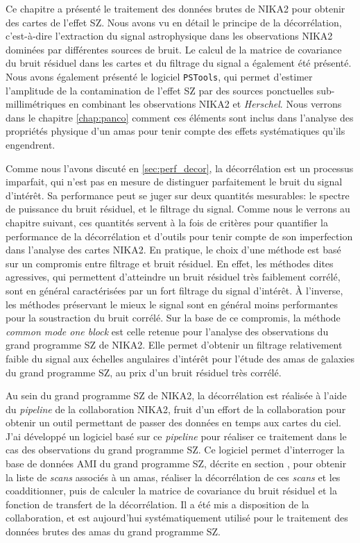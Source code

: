 Ce chapitre a présenté le traitement des données brutes de NIKA2 pour obtenir des cartes de l'effet SZ.
Nous avons vu en détail le principe de la décorrélation, c'est-à-dire l'extraction du signal astrophysique dans les observations NIKA2 dominées par différentes sources de bruit.
Le calcul de la matrice de covariance du bruit résiduel dans les cartes et du filtrage du signal a également été présenté.
Nous avons également présenté le logiciel \texttt{PSTools}, qui permet d'estimer l'amplitude de la contamination de l'effet SZ par des sources ponctuelles sub-millimétriques en combinant les observations NIKA2 et \textit{Herschel}.
Nous verrons dans le chapitre \ref{chap:panco} comment ces éléments sont inclus dans l'analyse des propriétés physique d'un amas pour tenir compte des effets systématiques qu'ils engendrent.

Comme nous l'avons discuté en \ref{sec:perf_decor}, la décorrélation est un processus imparfait, qui n'est pas en mesure de distinguer parfaitement le bruit du signal d'intérêt.
Sa performance peut se juger sur deux quantités mesurables: le spectre de puissance du bruit résiduel, et le filtrage du signal.
Comme nous le verrons au chapitre suivant, ces quantités servent à la fois de critères pour quantifier la performance de la décorrélation et d'outils pour tenir compte de son imperfection dans l'analyse des cartes NIKA2.
En pratique, le choix d'une méthode est basé sur un compromis entre filtrage et bruit résiduel.
En effet, les méthodes dites agressives, qui permettent d'atteindre un bruit résiduel très faiblement corrélé, sont en général caractérisées par un fort filtrage du signal d'intérêt.
À l'inverse, les méthodes préservant le mieux le signal sont en général moins performantes pour la soustraction du bruit corrélé.
Sur la base de ce compromis, la méthode \textit{common mode one block} est celle retenue pour l'analyse des observations du grand programme SZ de NIKA2.
Elle permet d'obtenir un filtrage relativement faible du signal aux échelles angulaires d'intérêt pour l'étude des amas de galaxies du grand programme SZ, au prix d'un bruit résiduel très corrélé.

Au sein du grand programme SZ de NIKA2, la décorrélation est réalisée à l'aide du \textit{pipeline} de la collaboration NIKA2, fruit d'un effort de la collaboration pour obtenir un outil permettant de passer des données en temps aux cartes du ciel.
J'ai développé un logiciel basé sur ce \textit{pipeline} pour réaliser ce traitement dans le cas des observations du grand programme SZ.
Ce logiciel permet d'interroger la base de données AMI du grand programme SZ, décrite en section , pour obtenir la liste de \textit{scans} associés à un amas, réaliser la décorrélation de ces \textit{scans} et les coadditionner, puis de calculer la matrice de covariance du bruit résiduel et la fonction de transfert de la décorrélation.
Il a été mis a disposition de la collaboration, et est aujourd'hui systématiquement utilisé pour le traitement des données brutes des amas du grand programme SZ.

